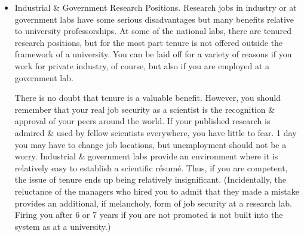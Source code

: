 \documentclass{article}
\begin{document}
\begin{enumerate}
\begin{itemize}
\begin{itemize}
			There \textit{are} pleasures to working as an assistant professor. Teaching \& interacting with students can be exciting. The university environment is in itself very stimulating. There are certainly more kinds of people with more diverse interests than in any industrial lab. You do get respect from the community. On the other hand, the price of being an assistant professor is much too high. The hours are long, the pay is terrible, \& the job security is bad. After your years of study for a PhD \& further years as a postdoctoral apprentice, you will probably be about 30 years old. You'll probably be starting a family. Your former colleagues who went to engineering or business school will be making their way in the world, earning good salaries, \& having time to participate in activities outside their jobs. Do you want to be working 16 hours a day for half what they are earning, on the chance that after 5 or 6 years your department may give you tenure? If enough of you answers ``no,'' maybe the job conditions will improve. Until then, I recommend that you find a position in an industrial or government research lab. There you can establish a reputation with much less pain, as discussed below, \&, reputation in hand, can start at the top in a university job, if that is still what you want.
			\item {\sf Industrial \& Government Research Positions.} Research jobs in industry or at government labs have some serious disadvantages but many benefits relative to university professorships. At some of the national labs, there are tenured research positions, but for the most part tenure is not offered outside the framework of a university. You can be laid off for a variety of reasons if you work for private industry, of course, but also if you are employed at a government lab.

			There is no doubt that tenure is a valuable benefit. However, you should remember that your real job security as a scientist is the recognition \& approval of your peers around the world. If your published research is admired \& used by fellow scientists everywhere, you have little to fear. 1 day you may have to change job locations, but unemployment should not be a worry. Industrial \& government labs provide an environment where it is relatively easy to establish a scientific r\'esum\'e. Thus, if you are competent, the issue of tenure ends up being relatively insignificant. (Incidentally, the reluctance of the managers who hired you to admit that they made a mistake provides an additional, if melancholy, form of job security at a research lab. Firing you after 6 or 7 years if you are not promoted is not built into the system as at a university.)


\end{itemize}
\end{itemize}
\end{enumerate}
\end{document}
